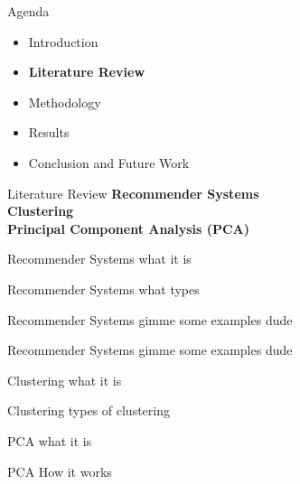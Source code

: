 \begin{frame}{Agenda}
\begin{itemize}
    \item Introduction
    \item \textbf{Literature Review}
    \item Methodology
    \item Results
    \item Conclusion and Future Work
\end{itemize}
\end{frame}


\begin{frame}{Literature Review}
\textbf{Recommender Systems\\}
\vspace{0.5cm}
\textbf{Clustering\\}
\vspace{0.5cm}
\textbf{Principal Component Analysis (PCA)}
\end{frame}


\begin{frame}{Recommender Systems}
    what it is
\end{frame}


\begin{frame}{Recommender Systems}
    what types
\end{frame}


\begin{frame}{Recommender Systems}
    gimme some examples dude
\end{frame}


\begin{frame}{Recommender Systems}
    gimme some examples dude
\end{frame}


\begin{frame}{Clustering}
    what it is
\end{frame}


\begin{frame}{Clustering}
    types of clustering
\end{frame}


\begin{frame}{PCA}
    what it is
\end{frame}

%

\begin{frame}{PCA}
    How it works
\end{frame}
